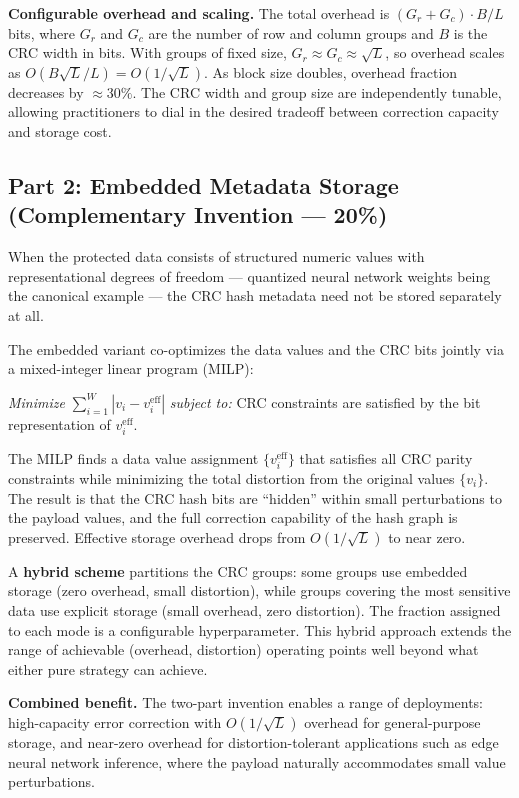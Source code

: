 \textbf{Configurable overhead and scaling.}
The total overhead is $(G_r + G_c) \cdot B / L$ bits, where $G_r$ and $G_c$ are the number of row and column groups and $B$ is the CRC width in bits.
With groups of fixed size, $G_r \approx G_c \approx \sqrt{L}$, so overhead scales as $O(B\sqrt{L}/L) = O(1/\sqrt{L})$.
As block size doubles, overhead fraction decreases by $\approx 30\%$.
The CRC width and group size are independently tunable, allowing practitioners to dial in the desired tradeoff between correction capacity and storage cost.

\subsection*{Part 2: Embedded Metadata Storage (Complementary Invention --- 20\%)}

When the protected data consists of structured numeric values with representational degrees of freedom --- quantized neural network weights being the canonical example --- the CRC hash metadata need not be stored separately at all.

The embedded variant co-optimizes the data values and the CRC bits jointly via a mixed-integer linear program (MILP):

\begin{center}
\textit{Minimize} $\displaystyle\sum_{i=1}^{W} |v_i - v_i^{\text{eff}}|$ \quad \textit{subject to:} CRC constraints are satisfied by the bit representation of $v_i^{\text{eff}}$.
\end{center}

The MILP finds a data value assignment $\{v_i^{\text{eff}}\}$ that satisfies all CRC parity constraints while minimizing the total distortion from the original values $\{v_i\}$.
The result is that the CRC hash bits are ``hidden'' within small perturbations to the payload values, and the full correction capability of the hash graph is preserved.
Effective storage overhead drops from $O(1/\sqrt{L})$ to near zero.

A \textbf{hybrid scheme} partitions the CRC groups: some groups use embedded storage (zero overhead, small distortion), while groups covering the most sensitive data use explicit storage (small overhead, zero distortion).
The fraction assigned to each mode is a configurable hyperparameter.
This hybrid approach extends the range of achievable (overhead, distortion) operating points well beyond what either pure strategy can achieve.

\textbf{Combined benefit.}
The two-part invention enables a range of deployments: high-capacity error correction with $O(1/\sqrt{L})$ overhead for general-purpose storage, and near-zero overhead for distortion-tolerant applications such as edge neural network inference, where the payload naturally accommodates small value perturbations.
